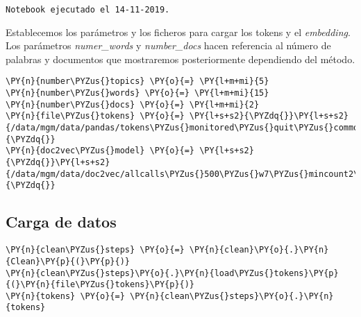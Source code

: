     \begin{Verbatim}[commandchars=\\\{\}]
Notebook ejecutado el 14-11-2019.
    \end{Verbatim}

    Establecemos los parámetros y los ficheros para cargar los tokens y el
\emph{embedding}. Los parámetros \emph{numer\_words} y
\emph{number\_docs} hacen referencia al número de palabras y documentos
que mostraremos posteriormente dependiendo del método.

    \begin{tcolorbox}[breakable, size=fbox, boxrule=1pt, pad at break*=1mm,colback=cellbackground, colframe=cellborder]
\begin{Verbatim}[commandchars=\\\{\}]
\PY{n}{number\PYZus{}topics} \PY{o}{=} \PY{l+m+mi}{5}
\PY{n}{number\PYZus{}words} \PY{o}{=} \PY{l+m+mi}{15}
\PY{n}{number\PYZus{}docs} \PY{o}{=} \PY{l+m+mi}{2}
\PY{n}{file\PYZus{}tokens} \PY{o}{=} \PY{l+s+s2}{\PYZdq{}}\PY{l+s+s2}{/data/mgm/data/pandas/tokens\PYZus{}monitored\PYZus{}quit\PYZus{}commons\PYZus{}12112019.pkl}\PY{l+s+s2}{\PYZdq{}}
\PY{n}{doc2vec\PYZus{}model} \PY{o}{=} \PY{l+s+s2}{\PYZdq{}}\PY{l+s+s2}{/data/mgm/data/doc2vec/allcalls\PYZus{}500\PYZus{}w7\PYZus{}mincount2\PYZus{}quit\PYZus{}commons\PYZus{}02112019}\PY{l+s+s2}{\PYZdq{}}
\end{Verbatim}
\end{tcolorbox}

    \hypertarget{carga-de-datos}{%
\subsection{Carga de datos}\label{carga-de-datos}}

    \begin{tcolorbox}[breakable, size=fbox, boxrule=1pt, pad at break*=1mm,colback=cellbackground, colframe=cellborder]
\begin{Verbatim}[commandchars=\\\{\}]
\PY{n}{clean\PYZus{}steps} \PY{o}{=} \PY{n}{clean}\PY{o}{.}\PY{n}{Clean}\PY{p}{(}\PY{p}{)}
\PY{n}{clean\PYZus{}steps}\PY{o}{.}\PY{n}{load\PYZus{}tokens}\PY{p}{(}\PY{n}{file\PYZus{}tokens}\PY{p}{)}
\PY{n}{tokens} \PY{o}{=} \PY{n}{clean\PYZus{}steps}\PY{o}{.}\PY{n}{tokens}
\end{Verbatim}
\end{tcolorbox}

